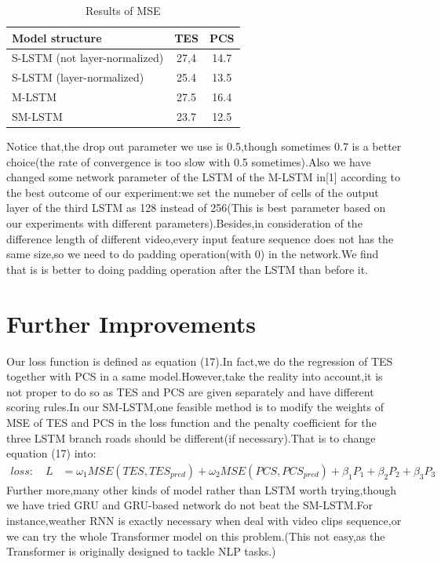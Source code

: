 \documentclass{article}
\begin{document}
\begin{table}[H]
  \caption{Results of MSE}
  \label{mse}
  \centering
  \begin{tabular}{lcc}
    \toprule
    
    Model structure     & TES     & PCS \\
    \midrule
    S-LSTM (not layer-normalized) & 27,4  & 14.7   \\
    S-LSTM (layer-normalized)    & 25.4 & 13.5      \\
    M-LSTM     & 27.5      &  16.4  \\
    SM-LSTM    & 23.7    &12.5\\
    \bottomrule
  \end{tabular}
\end{table}
Notice that,the drop out parameter we use is 0.5,though sometimes 0.7 is a better choice(the rate of convergence is too slow with 0.5 sometimes).Also we have changed some network parameter of the LSTM of the M-LSTM in[1] according to the best  outcome of our experiment:we set the numeber of cells of the output layer of the third LSTM as 128 instead of 256(This is best parameter based on our experiments with different parameters).Besides,in consideration of the difference length of different video,every input feature sequence does not has the same size,so we need to do padding operation(with 0) in the network.We find that is is better to doing padding operation after the LSTM than before it.

\section{Further Improvements}
Our loss function is defined as equation (17).In fact,we do the regression of TES together with PCS in a same model.However,take the reality into account,it is not proper to do so as TES and PCS are given separately and have different scoring rules.In our SM-LSTM,one feasible method is to modify the weights of MSE of TES and PCS in the loss function and the penalty coefficient for the three LSTM branch roads should be different(if necessary).That is to change equation (17) into:
\begin{align}
loss:\quad L&=\omega_{1}MSE(TES, TES_{pred})+\omega_{2}MSE(PCS, PCS_{pred})+\beta_{1}P_1+\beta_{2}P_2+\beta_{3}P_3
\end{align}
Further more,many other kinds of model rather than LSTM worth trying,though we have tried GRU and GRU-based network do not beat the SM-LSTM.For instance,weather RNN is exactly necessary when deal with video clips sequence,or we can try the whole Transformer model on this problem.(This not easy,as the Transformer is originally designed to tackle NLP tasks.)
\end{document}
